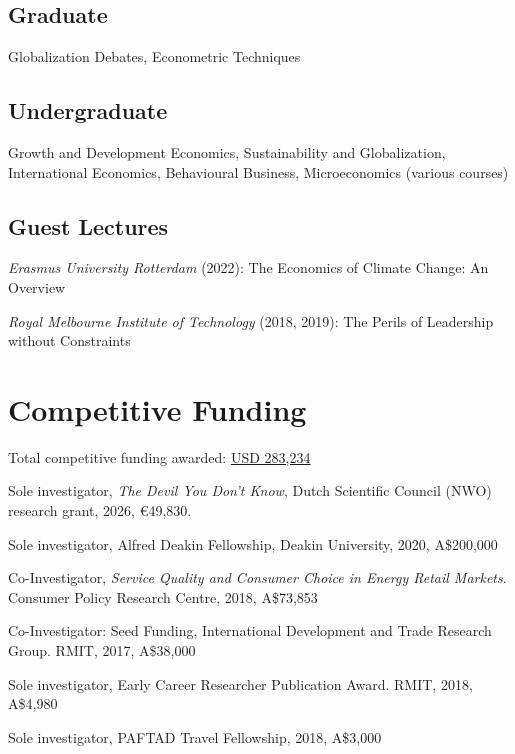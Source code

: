 \documentclass[letterpaper]{article}
\renewenvironment{itemize}{
  \begin{list}{}{
    \setlength{\leftmargin}{1.5em}
  }
}{
  \end{list}
}
\begin{document}
\subsection*{Graduate}

\begin{itemize}
\item Globalization Debates, Econometric Techniques
\end{itemize}

\subsection*{Undergraduate}

\begin{itemize}
\item Growth and Development Economics, Sustainability and Globalization, International Economics, Behavioural Business, Microeconomics (various courses)
\end{itemize}

\subsection*{Guest Lectures}

\begin{itemize}
\item \textit{Erasmus University Rotterdam} (2022): The Economics of Climate Change: An Overview
\item \textit{Royal Melbourne Institute of Technology} (2018, 2019): The Perils of Leadership without Constraints
\end{itemize}

\section*{Competitive Funding}

\begin{itemize}
\item Total competitive funding awarded: \underline{USD 283,234}
\item Sole investigator, \textit{The Devil You Don't Know}, Dutch Scientific Council (NWO) research grant, 2026, €49,830. 
\item Sole investigator, Alfred Deakin Fellowship, Deakin University, 2020, A\$200,000
\item Co-Investigator, \textit{Service Quality and Consumer Choice in Energy Retail Markets}. Consumer Policy Research Centre, 2018, A\$73,853
\item Co-Investigator: Seed Funding, International Development and Trade Research Group. RMIT, 2017, A\$38,000
\item Sole investigator, Early Career Researcher Publication Award. RMIT, 2018, A\$4,980
\item Sole investigator, PAFTAD Travel Fellowship, 2018, A\$3,000
\end{itemize}
\end{document}
